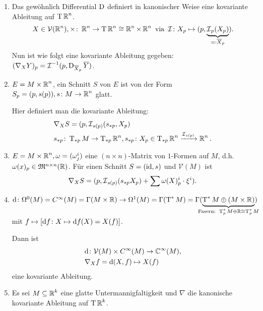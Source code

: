 \begin{bsp}
  \begin{enumerate}[label=(\arabic*)]

  \item Das gewöhnlich Differential $\operatorname{D}$ definiert in kanonischer Weise eine kovariante Ableitung auf $\operatorname{T}\operatorname{\mathbb{R}}^n$.
    \begin{align*}
      X \in \mathcal V(\operatorname{\mathbb{R}}^n), \times \colon \operatorname{\mathbb{R}}^n \to \operatorname{T}\operatorname{\mathbb{R}}^n \cong \operatorname{\mathbb{R}}^n \times \operatorname{\mathbb{R}}^n \text{ via } \operatorname{\mathcal{I}}\colon X_p \mapsto (p,\underbrace{\operatorname{\mathcal{I}}_p(X_p)}_{=:\overline X_p}).
    \end{align*}
    Nun ist wie folgt eine kovariante Ableitung gegeben: $(\nabla_XY)_p = \operatorname{\mathcal{I}}^{-1}(p,\operatorname{D}_{\overline X_p}\overline Y)$.

  \item $E = M \times \operatorname{\mathbb{R}}^n$, ein Schnitt $S$ von $E$ ist von der Form $S_p = (p,s(p)), s \colon M \to \operatorname{\mathbb{R}}^n$ glatt.

    Hier definiert man die kovariante Ableitung:
    \begin{align*}
      & \nabla_XS = (p,\operatorname{\mathcal{I}}_{s(p)}(s_{*p},X_p)\\
      &  s_{*p}\colon \operatorname{T}_{*p}M \to \operatorname{T}_{*p}\operatorname{\mathbb{R}}^n, s_{*p}\colon X_p \in \operatorname{T}_{*p}\operatorname{\mathbb{R}}^n \xrightarrow{\operatorname{\mathcal{I}}_{s(p)}} \operatorname{\mathbb{R}}^n.
    \end{align*}

  \item $E = M \times \operatorname{\mathbb{R}}^n, \omega = (\omega_j^i)$ eine $(n\times n)$-Matrix
    von $1$-Formen auf $M$, d.h. $\omega(x)_p \in \mathfrak M^{n\times n}(\operatorname{\mathbb{R}})$.
    Für einen Schnitt $S = (\operatorname{id}, s)$ und $\mathcal V(M)$ ist 
    \begin{align*}
      \nabla_XS = (p,\operatorname{\mathcal{I}}_{s(p)}(s_{*p}X_p) + \sum \omega(X)_p^i\cdot \xi^i).
    \end{align*}

  \item $\dop \colon \Omega^0(M) = C^{\infty}(M) = \Gamma(M\times \R) \to \Omega^1(M) = \Gamma(\T^{*}M) = \Gamma(\underbrace{\T^{*}M \oplus (M \times \R)}_{\mathclap{\text{Fasern: } \T_p^{*}M\oplus\R \cong \T_p^{*}M}})$ mit $f \mapsto [\mathrm{d} f \colon X \mapsto \mathrm{d} f(X) = X(f)]$.

Dann ist
\begin{align*}
& \mathrm{d} \colon \mathcal V(M) \times C^{\infty}(M) \to \operatorname{\mathbb{C}}^{\infty}(M),\\
& \nabla_Xf = \mathrm{d} (X,f) \mapsto X(f)
\end{align*}
eine kovariante Ableitung.

\item Es sei $M \subseteq \operatorname{\mathbb{R}}^k$ eine glatte Untermannigfaltigkeit und $\nabla$ die kanonische kovariante Ableitung auf $\operatorname{T} \operatorname{\mathbb{R}}^k$. 


\end{enumerate}
\end{bsp}

